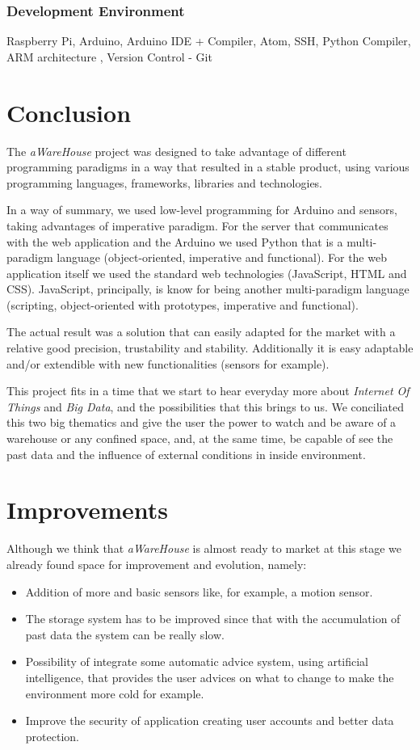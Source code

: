 \documentclass[12pt]{report}
\begin{document}
\subsection{Development Environment}

Raspberry Pi, Arduino, Arduino IDE  + Compiler, Atom, SSH, Python Compiler, ARM architecture , Version Control - Git

\newpage
\chapter{Conclusion}

The \textit{aWareHouse} project was designed to take advantage of different programming paradigms in a way that resulted in a stable product, using various programming languages, frameworks, libraries and technologies. 

In a way of summary, we used low-level programming for Arduino and sensors, taking advantages of imperative paradigm. For the server that communicates with the web application and the Arduino we used Python that is a multi-paradigm language (object-oriented, imperative and functional). For the web application itself we used the standard web technologies (JavaScript, HTML and CSS). JavaScript, principally, is know for being another multi-paradigm language (scripting, object-oriented with prototypes, imperative and functional).

The actual result was a solution that can easily adapted for the market with a relative good precision, trustability and stability. Additionally it is easy adaptable and/or extendible with new functionalities (sensors for example).

This project fits in a time that we start to hear everyday more about \textit{Internet Of Things} and \textit{Big Data}, and the possibilities that this brings to us. We conciliated this two big thematics and give the user the power to watch and be aware of a warehouse or any confined space, and, at the same time, be capable of see the past data and the influence of external conditions in inside environment.

\newpage
\chapter{Improvements}

Although we think that \textit{aWareHouse} is almost ready to market at this stage we already found space for improvement and evolution, namely:
\begin{itemize}
 \item Addition of more and basic sensors like, for example, a motion sensor.
 \item The storage system has to be improved since that with the accumulation of past data the system can be really slow.
 \item Possibility of integrate some automatic advice system, using artificial intelligence, that provides the user advices on what to change to make the environment more cold for example.
 \item Improve the security of application creating user accounts and better data protection.
\end{itemize} 
\end{document}
